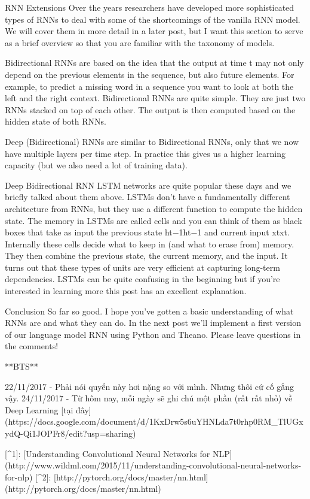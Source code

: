 RNN Extensions
Over the years researchers have developed more sophisticated types of RNNs to deal with some of the shortcomings of the vanilla RNN model. We will cover them in more detail in a later post, but I want this section to serve as a brief overview so that you are familiar with the taxonomy of models.

Bidirectional RNNs are based on the idea that the output at time t may not only depend on the previous elements in the sequence, but also future elements. For example, to predict a missing word in a sequence you want to look at both the left and the right context. Bidirectional RNNs are quite simple. They are just two RNNs stacked on top of each other. The output is then computed based on the hidden state of both RNNs.

Deep (Bidirectional) RNNs are similar to Bidirectional RNNs, only that we now have multiple layers per time step. In practice this gives us a higher learning capacity (but we also need a lot of training data).

Deep Bidirectional RNN LSTM networks are quite popular these days and we briefly talked about them above. LSTMs don’t have a fundamentally different architecture from RNNs, but they use a different function to compute the hidden state. The memory in LSTMs are called cells and you can think of them as black boxes that take as input the previous state ht−1ht−1 and current input xtxt. Internally these cells decide what to keep in (and what to erase from) memory. They then combine the previous state, the current memory, and the input. It turns out that these types of units are very efficient at capturing long-term dependencies. LSTMs can be quite confusing in the beginning but if you’re interested in learning more this post has an excellent explanation.

Conclusion
So far so good. I hope you’ve gotten a basic understanding of what RNNs are and what they can do. In the next post we’ll implement a first version of our language model RNN using Python and Theano. Please leave questions in the comments!

**BTS**

22/11/2017 - Phải nói quyển này hơi nặng so với mình. Nhưng thôi cứ cố gắng vậy.
24/11/2017 - Từ hôm nay, mỗi ngày sẽ ghi chú một phần (rất rất nhỏ) về Deep Learning [tại đây](https://docs.google.com/document/d/1KxDrw5s6uYHNLda7t0rhp0RM_TlUGxydQ-Qi1JOPFr8/edit?usp=sharing)
\usepackage{comment}

[^1]: [Understanding Convolutional Neural Networks for NLP](http://www.wildml.com/2015/11/understanding-convolutional-neural-networks-for-nlp)
[^2]: [http://pytorch.org/docs/master/nn.html](http://pytorch.org/docs/master/nn.html)